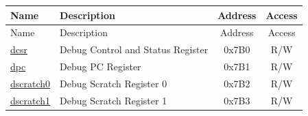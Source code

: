 \begin{longtable}{ | p{4.0cm} | p{8.4cm} | c | c| }
\hline\rowcolor{lightgray}
Name & Description & Address & Access \\ \hline
\endfirsthead
\hline
\rowcolor{lightgray}
Name & Description & Address & Access  \\
\hline
\endhead
\endfoot

\hyperref[regdesc:DCSR]{dcsr} & Debug Control and Status Register & 0x7B0 & R/W \\\hline
\hyperref[regdesc:DPC]{dpc} & Debug PC Register & 0x7B1 & R/W \\\hline
\hyperref[regdesc:DSCRATCH0]{dscratch0} & Debug Scratch Register 0 & 0x7B2 & R/W \\\hline
\hyperref[regdesc:DSCRATCH1]{dscratch1} & Debug Scratch Register 1 & 0x7B3 & R/W \\\hline
\end{longtable}